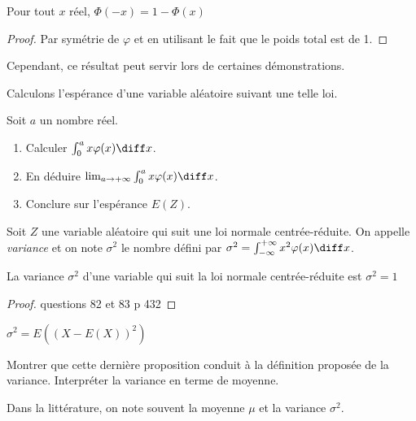 \documentclass[11pt,a4paper,french]{article}
\begin{document}
\begin{proposition}
  Pour tout $x$ réel, $\Phi(-x) = 1 - \Phi(x)$
\end{proposition}
\begin{proof}
  Par symétrie de $\varphi$ et en utilisant le fait que le poids total
  est de 1.
\end{proof}

Cependant, ce résultat peut servir lors de certaines démonstrations.

Calculons l'espérance d'une variable aléatoire suivant une telle loi.

\begin{question}
  Soit $a$ un nombre réel.
  \begin{enumerate}
    \item Calculer $\int_0^a x\varphi(x) \diff x$.
    \item En déduire $\lim_{a\to+\infty} \int_0^a x\varphi(x) \diff x$.
    \item Conclure sur l'espérance $E(Z)$.
  \end{enumerate}
\end{question}

\begin{definition}[Variance]
  Soit $Z$ une variable aléatoire qui suit une loi normale
  centrée-réduite. On appelle \emph{variance} et on note $\sigma^2$ le
  nombre défini par $\sigma^2 = \int_{-\infty}^{+\infty} x^2\varphi(x)
  \diff x$.
\end{definition}

\begin{proposition}
  La variance $\sigma^2$ d'une variable qui suit la loi normale
  centrée-réduite est $\sigma^2 = 1$
\end{proposition}
\begin{proof}
  questions 82 et 83 p 432
\end{proof}

\begin{proposition}[admise]
  $\sigma^2 = E((X - E(X))^2)$
\end{proposition}

\begin{question}
  Montrer que cette dernière proposition conduit à la définition
  proposée de la variance. Interpréter la variance en terme de
  moyenne.
\end{question}

Dans la littérature, on note souvent la moyenne $\mu$ et la variance
$\sigma^2$.

\pagebreak
\end{document}
